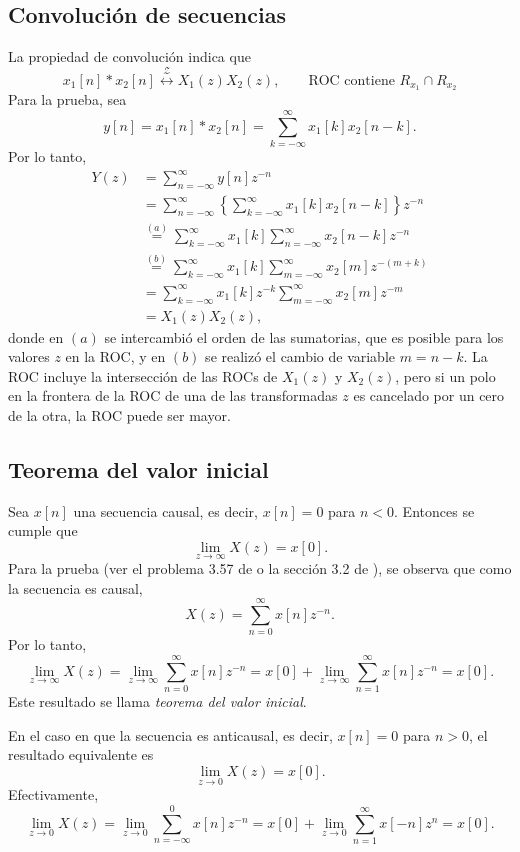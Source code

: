 \documentclass[a4paper]{report}
\begin{document}
\subsection{Convolución de secuencias}

La propiedad de convolución indica que
\[
 x_1[n]*x_2[n]\overset{\mathcal{Z}}{\longleftrightarrow}X_1(z)X_2(z),\qquad\textrm{ROC contiene }R_{x_1}\cap R_{x_2}
\]
Para la prueba, sea 
\[
 y[n]=x_1[n]*x_2[n]=\sum_{k=-\infty}^{\infty}x_1[k]x_2[n-k].
\]
Por lo tanto,
\begin{align*}
 Y(z)&=\sum_{n=-\infty}^{\infty}y[n]z^{-n}\\
  &=\sum_{n=-\infty}^{\infty}\left\lbrace\sum_{k=-\infty}^{\infty}x_1[k]x_2[n-k]\right\rbrace z^{-n}\\
  &\overset{(a)}{=}\sum_{k=-\infty}^{\infty}x_1[k]\sum_{n=-\infty}^{\infty}x_2[n-k] z^{-n}\\
  &\overset{(b)}{=}\sum_{k=-\infty}^{\infty}x_1[k]\sum_{m=-\infty}^{\infty}x_2[m] z^{-(m+k)}\\
  &=\sum_{k=-\infty}^{\infty}x_1[k] z^{-k}\sum_{m=-\infty}^{\infty}x_2[m] z^{-m}\\
  &=X_1(z)X_2(z),
\end{align*}
donde en \((a)\) se intercambió el orden de las sumatorias, que es posible para los valores \(z\) en la ROC, y en \((b)\) se realizó el cambio de variable \(m=n-k\). La ROC incluye la intersección de las ROCs de \(X_1(z)\) y \(X_2(z)\), pero si un polo en la frontera de la ROC de una de las transformadas \(z\) es cancelado por un cero de la otra, la ROC puede ser mayor.

\subsection{Teorema del valor inicial} 

Sea \(x[n]\) una secuencia causal, es decir, \(x[n]=0\) para \(n<0\). Entonces se cumple que 
\[
 \lim_{z\to\infty}X(z)=x[0].
\]
Para la prueba (ver el problema 3.57 de \cite{oppenheim2009discrete} o la sección 3.2 de \cite{proakis06digital}), se observa que como la secuencia es causal,
\[
 X(z)=\sum_{n=0}^\infty x[n]z^{-n}.
\]
Por  lo tanto,
\[
 \lim_{z\to\infty}X(z)=\lim_{z\to\infty}\sum_{n=0}^\infty x[n]z^{-n}=x[0]+\lim_{z\to\infty}\sum_{n=1}^\infty x[n]z^{-n}=x[0].
\]
Este resultado se llama \emph{teorema del valor inicial}.

En el caso en que la secuencia es anticausal, es decir, \(x[n]=0\) para \(n>0\), el resultado equivalente es
\[
 \lim_{z\to0}X(z)=x[0].
\]
Efectivamente,
\[
 \lim_{z\to0}X(z)=\lim_{z\to0}\sum_{n=-\infty}^0 x[n]z^{-n}=x[0]+\lim_{z\to0}\sum_{n=1}^\infty x[-n]z^{n}=x[0].
\]
\end{document}
